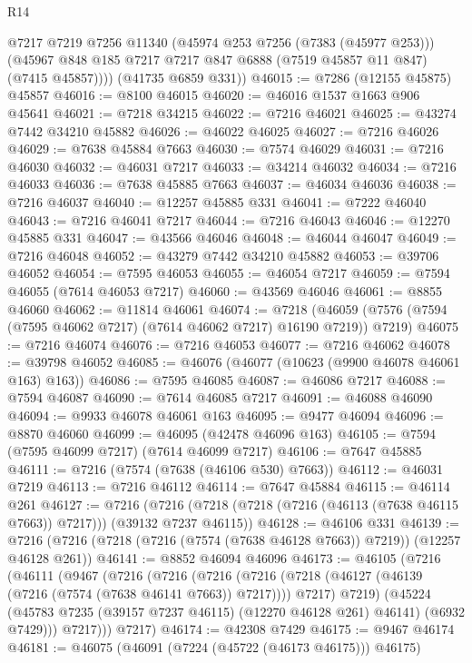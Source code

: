 \begin{lexlean}{R14}
\begin{coremodule}
          @7217
          @7219
          @7256
          @11340
          (@45974 @253 @7256 (@7383 (@45977 @253)))
          (@45967 @848 @185 @7217 @7217 @847 @6888 (@7519 @45857 @11 @847) (@7415 @45857))))
      (@41735 @6859 @331))
@46015 := @7286 (@12155 @45875) @45857
@46016 := @8100 @46015
@46020 := @46016 @1537 @1663 @906 @45641
@46021 := @7218 @34215
@46022 := @7216 @46021
@46025 := @43274 @7442 @34210 @45882
@46026 := @46022 @46025
@46027 := @7216 @46026
@46029 := @7638 @45884 @7663
@46030 := @7574 @46029
@46031 := @7216 @46030
@46032 := @46031 @7217
@46033 := @34214 @46032
@46034 := @7216 @46033
@46036 := @7638 @45885 @7663
@46037 := @46034 @46036
@46038 := @7216 @46037
@46040 := @12257 @45885 @331
@46041 := @7222 @46040
@46043 := @7216 @46041 @7217
@46044 := @7216 @46043
@46046 := @12270 @45885 @331
@46047 := @43566 @46046
@46048 := @46044 @46047
@46049 := @7216 @46048
@46052 := @43279 @7442 @34210 @45882
@46053 := @39706 @46052
@46054 := @7595 @46053
@46055 := @46054 @7217
@46059 := @7594 @46055 (@7614 @46053 @7217)
@46060 := @43569 @46046
@46061 := @8855 @46060
@46062 := @11814 @46061
@46074 := @7218
    (@46059 (@7576 (@7594 (@7595 @46062 @7217) (@7614 @46062 @7217) @16190 @7219)) @7219)
@46075 := @7216 @46074
@46076 := @7216 @46053
@46077 := @7216 @46062
@46078 := @39798 @46052
@46085 := @46076 (@46077 (@10623 (@9900 @46078 @46061 @163) @163))
@46086 := @7595 @46085
@46087 := @46086 @7217
@46088 := @7594 @46087
@46090 := @7614 @46085 @7217
@46091 := @46088 @46090
@46094 := @9933 @46078 @46061 @163
@46095 := @9477 @46094
@46096 := @8870 @46060
@46099 := @46095 (@42478 @46096 @163)
@46105 := @7594 (@7595 @46099 @7217) (@7614 @46099 @7217)
@46106 := @7647 @45885
@46111 := @7216 (@7574 (@7638 (@46106 @530) @7663))
@46112 := @46031 @7219
@46113 := @7216 @46112
@46114 := @7647 @45884
@46115 := @46114 @261
@46127 := @7216
    (@7216 (@7218 (@7218 (@7216 (@46113 (@7638 @46115 @7663)) @7217))) (@39132 @7237 @46115))
@46128 := @46106 @331
@46139 := @7216 (@7216 (@7218 (@7216 (@7574 (@7638 @46128 @7663)) @7219)) (@12257 @46128 @261))
@46141 := @8852 @46094 @46096
@46173 := @46105
    (@7216
      (@46111
        (@9467
          (@7216
            (@7216
              (@7216
                (@7216 (@7218 (@46127 (@46139 (@7216 (@7574 (@7638 @46141 @7663)) @7217)))) @7217)
                @7219)
              (@45224
                (@45783 @7235 (@39157 @7237 @46115) (@12270 @46128 @261) @46141)
                (@6932 @7429)))
            @7217)))
      @7217)
@46174 := @42308 @7429
@46175 := @9467 @46174
@46181 := @46075 (@46091 (@7224 (@45722 (@46173 @46175))) @46175)

\end{coremodule}
\end{lexlean}
